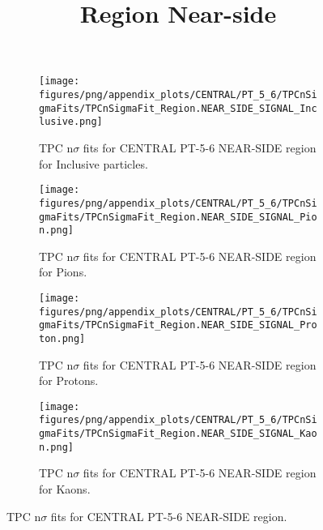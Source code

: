             \begin{figure}[H]
                \title{Region Near-side}
                \begin{subfigure}[b]{0.5\textwidth}
                    \centering
                    \texttt{[image: figures/png/appendix\_plots/CENTRAL/PT\_5\_6/TPCnSigmaFits/TPCnSigmaFit\_Region.NEAR\_SIDE\_SIGNAL\_Inclusive.png]}
                    \caption{TPC n$\sigma$ fits for CENTRAL PT-5-6 NEAR-SIDE region for Inclusive particles.}
                    \label{fig:appendix_CENTRAL_PT-5-6_NEAR_SIDE_SIGNAL_Inclusive}
                \end{subfigure}
                \begin{subfigure}[b]{0.5\textwidth}
                    \centering
                    \texttt{[image: figures/png/appendix\_plots/CENTRAL/PT\_5\_6/TPCnSigmaFits/TPCnSigmaFit\_Region.NEAR\_SIDE\_SIGNAL\_Pion.png]}
                    \caption{TPC n$\sigma$ fits for CENTRAL PT-5-6 NEAR-SIDE region for Pions.}
                    \label{fig:appendix_CENTRAL_PT-5-6_NEAR_SIDE_SIGNAL_Pion}
                \end{subfigure}
                \begin{subfigure}[b]{0.5\textwidth}
                    \centering
                    \texttt{[image: figures/png/appendix\_plots/CENTRAL/PT\_5\_6/TPCnSigmaFits/TPCnSigmaFit\_Region.NEAR\_SIDE\_SIGNAL\_Proton.png]}
                    \caption{TPC n$\sigma$ fits for CENTRAL PT-5-6 NEAR-SIDE region for Protons.}
                    \label{fig:appendix_CENTRAL_PT-5-6_NEAR_SIDE_SIGNAL_Proton}
                \end{subfigure}
                \begin{subfigure}[b]{0.5\textwidth}
                    \centering
                    \texttt{[image: figures/png/appendix\_plots/CENTRAL/PT\_5\_6/TPCnSigmaFits/TPCnSigmaFit\_Region.NEAR\_SIDE\_SIGNAL\_Kaon.png]}
                    \caption{TPC n$\sigma$ fits for CENTRAL PT-5-6 NEAR-SIDE region for Kaons.}
                    \label{fig:appendix_CENTRAL_PT-5-6_NEAR_SIDE_SIGNAL_Kaon}
                \end{subfigure}
                \caption{TPC n$\sigma$ fits for CENTRAL PT-5-6 NEAR-SIDE region.}
                \label{fig:appendix_CENTRAL_PT-5-6_NEAR_SIDE_SIGNAL}
            \end{figure}
